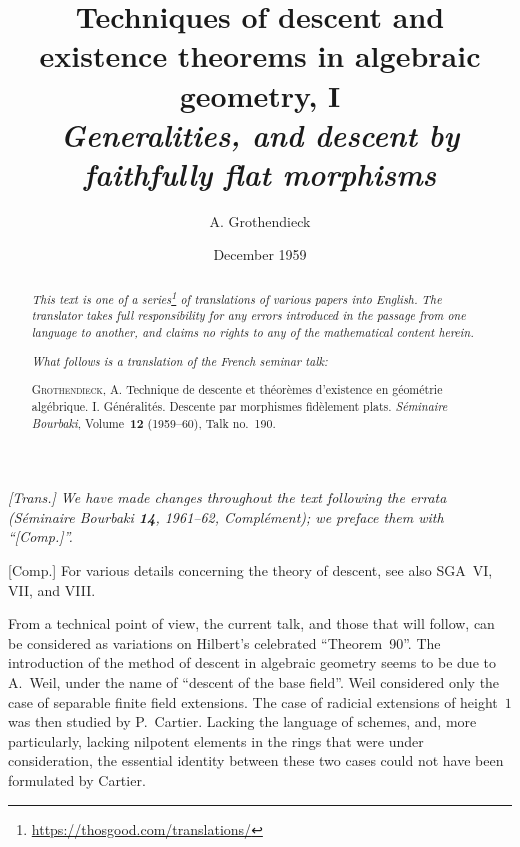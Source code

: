 \documentclass{article}
\title{Techniques of descent and existence theorems in algebraic geometry, I\\\emph{Generalities, and descent by faithfully flat morphisms}}
\author{A. Grothendieck}
\date{December 1959}
\theoremstyle{plain}
\theoremstyle{definition}
\newcommand{\oldpage}[1]{\marginpar{\footnotesize$\Big\vert$ \textit{p.~#1}}}
\begin{document}
\maketitle
\thispagestyle{fancy}

\renewcommand{\abstractname}{Translator's note.}

\begin{abstract}
  \renewcommand*{\thefootnote}{\fnsymbol{footnote}}
  \emph{This text is one of a series\footnote{\url{https://thosgood.com/translations/}} of translations of various papers into English.}
  \emph{The translator takes full responsibility for any errors introduced in the passage from one language to another, and claims no rights to any of the mathematical content herein.}

  \medskip
  
  \emph{What follows is a translation of the French seminar talk:}

  \medskip\noindent
  \textsc{Grothendieck, A.}
  Technique de descente et th\'{e}or\`{e}mes d'existence en g\'{e}om\'{e}trie alg\'{e}brique. I. G\'{e}n\'{e}ralit\'{e}s. Descente par morphismes fid\`{e}lement plats.
  \emph{S\'{e}minaire Bourbaki}, Volume~\textbf{12} (1959--60), Talk no.~190.
\end{abstract}

\setcounter{footnote}{0}

\setcounter{tocdepth}{1}
\tableofcontents



\subsubsection*{}

\emph{[Trans.] We have made changes throughout the text following the errata (\emph{S\'{e}minaire Bourbaki} \textbf{14}, 1961--62, Compl\'{e}ment); we preface them with ``[Comp.]''.}
\medskip

[Comp.] For various details concerning the theory of descent, see also SGA~VI, VII, and VIII.
\medskip

\oldpage{190-01}
From a technical point of view, the current talk, and those that will follow, can be considered as variations on Hilbert's celebrated ``Theorem~90''.
The introduction of the method of descent in algebraic geometry seems to be due to A.~Weil, under the name of ``descent of the base field''.
Weil considered only the case of separable finite field extensions.
The case of radicial extensions of height~$1$ was then studied by P.~Cartier.
Lacking the language of schemes, and, more particularly, lacking nilpotent elements in the rings that were under consideration, the essential identity between these two cases could not have been formulated by Cartier.
\end{document}
